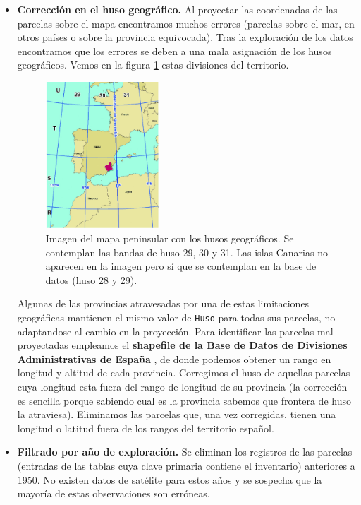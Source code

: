 \begin{itemize}
    \item \textbf{Corrección en el huso geográfico.} Al proyectar las coordenadas de las parcelas sobre el mapa encontramos muchos errores (parcelas sobre el mar, en otros países o sobre la provincia equivocada). Tras la exploración de los datos encontramos que los errores se deben a una mala asignación de los husos geográficos. Vemos en la figura \ref{fig:husos} estas divisiones del territorio. 
    \begin{figure}[H]
        \centering
        \includegraphics[width=0.4\textwidth]{figuras/husos.jpeg}
        \caption{\small Imagen del mapa peninsular con los husos geográficos. Se contemplan las bandas de huso 29, 30 y 31. Las islas Canarias no aparecen en la imagen pero sí que se contemplan en la base de datos (huso 28 y 29).}
        \label{fig:husos}
    \end{figure}
    
    Algunas de las provincias atravesadas por una de estas limitaciones geográficas mantienen el mismo valor de \texttt{Huso} para todas sus parcelas, no adaptandose al cambio en la proyección. Para identificar las parcelas mal proyectadas empleamos el \textbf{shapefile de la Base de Datos de Divisiones Administrativas de España} \cite{ign_shapefile}, de donde podemos obtener un rango en longitud y altitud de cada provincia. Corregimos el huso de aquellas parcelas cuya longitud esta fuera del rango de longitud de su provincia (la corrección es sencilla porque sabiendo cual es la provincia sabemos que frontera de huso la atraviesa). Eliminamos las parcelas que, una vez corregidas, tienen una longitud o latitud fuera de los rangos del territorio español. 

    \medskip

    \item \textbf{Filtrado por año de exploración.} Se eliminan los registros de las parcelas (entradas de las tablas cuya clave primaria contiene el inventario) anteriores a 1950. No existen datos de satélite para estos años y se sospecha que la mayoría de estas observaciones son erróneas. 


\end{itemize}
